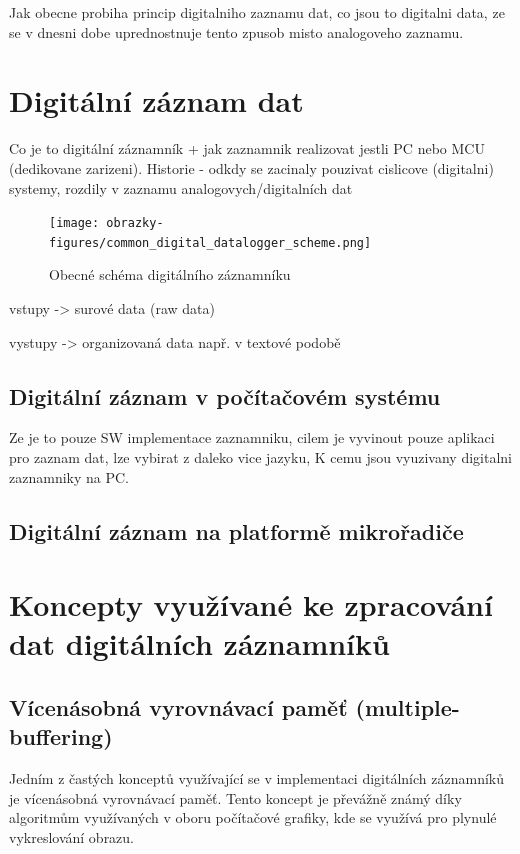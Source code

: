 Jak obecne probiha princip digitalniho zaznamu dat, co jsou to digitalni data, ze se v dnesni dobe uprednostnuje tento zpusob misto analogoveho zaznamu.

\section{Digitální záznam dat}
\label{digitalni_zaznamnik}
Co je to digitální záznamník + jak zaznamnik realizovat jestli PC nebo MCU (dedikovane zarizeni). Historie - odkdy se zacinaly pouzivat cislicove (digitalni) 
systemy, rozdily v zaznamu analogovych/digitalních dat

\begin{figure}[h] %
    \centering
    \texttt{[image: obrazky-figures/common\_digital\_datalogger\_scheme.png]}
    \caption{Obecné schéma digitálního záznamníku}
    \label{fig:polygraaf}
\end{figure}
vstupy -> surové data (raw data)

vystupy -> organizovaná data např. v textové podobě

\subsection{Digitální záznam v počítačovém systému}
Ze je to pouze SW implementace zaznamniku, cilem je vyvinout pouze aplikaci pro zaznam dat, lze vybirat z daleko vice jazyku, K cemu jsou vyuzivany digitalni 
zaznamniky na PC.

\subsection{Digitální záznam na platformě mikrořadiče}

\section{Koncepty využívané ke zpracování dat digitálních záznamníků}

\subsection{Vícenásobná vyrovnávací paměť (multiple-buffering)}
Jedním z častých konceptů využívající se v implementaci digitálních záznamníků je vícenásobná vyrovnávací paměť. Tento koncept je převážně známý díky 
algoritmům využívaných v oboru počítačové grafiky, kde se využívá pro plynulé vykreslování obrazu.

